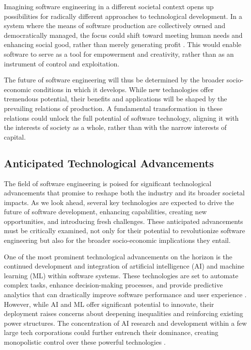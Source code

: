 \begin{refsection}
Imagining software engineering in a different societal context opens up possibilities for radically different approaches to technological development. In a system where the means of software production are collectively owned and democratically managed, the focus could shift toward meeting human needs and enhancing social good, rather than merely generating profit \cite[pp.~62-65]{schneider2018everything}. This would enable software to serve as a tool for empowerment and creativity, rather than as an instrument of control and exploitation.

The future of software engineering will thus be determined by the broader socio-economic conditions in which it develops. While new technologies offer tremendous potential, their benefits and applications will be shaped by the prevailing relations of production. A fundamental transformation in these relations could unlock the full potential of software technology, aligning it with the interests of society as a whole, rather than with the narrow interests of capital.

\subsection{Anticipated Technological Advancements}

The field of software engineering is poised for significant technological advancements that promise to reshape both the industry and its broader societal impacts. As we look ahead, several key technologies are expected to drive the future of software development, enhancing capabilities, creating new opportunities, and introducing fresh challenges. These anticipated advancements must be critically examined, not only for their potential to revolutionize software engineering but also for the broader socio-economic implications they entail.

One of the most prominent technological advancements on the horizon is the continued development and integration of artificial intelligence (AI) and machine learning (ML) within software systems. These technologies are set to automate complex tasks, enhance decision-making processes, and provide predictive analytics that can drastically improve software performance and user experience \cite[pp.~56-58]{goodfellow2016deep}. However, while AI and ML offer significant potential to innovate, their deployment raises concerns about deepening inequalities and reinforcing existing power structures. The concentration of AI research and development within a few large tech corporations could further entrench their dominance, creating monopolistic control over these powerful technologies \cite[pp.~70-72]{zuboff2020age}.


\end{refsection}

